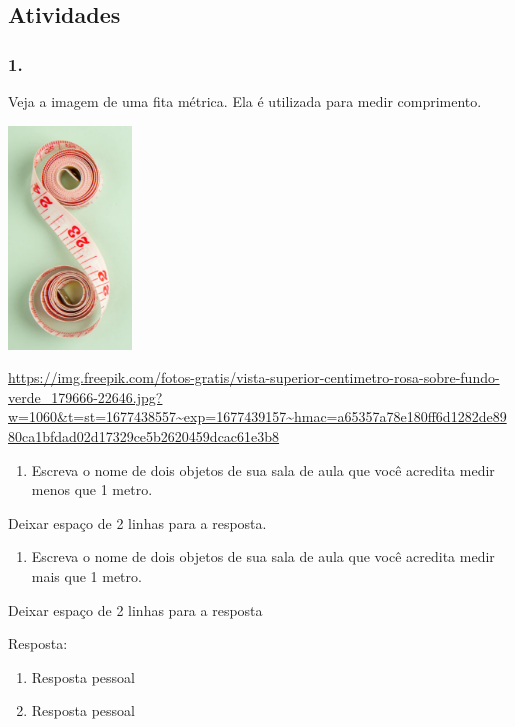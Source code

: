 \subsection{Atividades}\label{atividades-3}

\subsubsection{1.}\label{section-51}

Veja a imagem de uma fita métrica. Ela é utilizada para medir
comprimento.

\includegraphics[width=1.29167in,height=2.33463in]{media/image41.png}

\url{https://img.freepik.com/fotos-gratis/vista-superior-centimetro-rosa-sobre-fundo-verde_179666-22646.jpg?w=1060\&t=st=1677438557~exp=1677439157~hmac=a65357a78e180ff6d1282de8980ca1bfdad02d17329ce5b2620459dcac61e3b8}

\begin{enumerate}
\def\labelenumi{\alph{enumi})}
\item
  Escreva o nome de dois objetos de sua sala de aula que você acredita
  medir menos que 1 metro.
\end{enumerate}

Deixar espaço de 2 linhas para a resposta.

\begin{enumerate}
\def\labelenumi{\alph{enumi})}
\item
  Escreva o nome de dois objetos de sua sala de aula que você acredita
  medir mais que 1 metro.
\end{enumerate}

Deixar espaço de 2 linhas para a resposta

Resposta:

\begin{enumerate}
\def\labelenumi{\alph{enumi})}
\item
  Resposta pessoal
\item
  Resposta pessoal
\end{enumerate}

